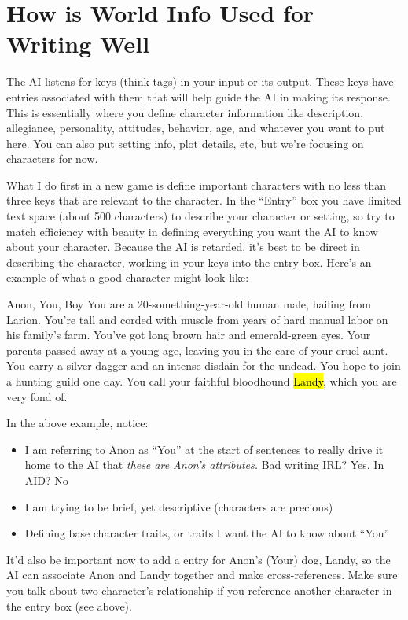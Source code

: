 \documentclass[Avsfag-main.tex]{subfiles}
\begin{document}
\section{How is World Info Used for Writing Well}

The AI listens for keys (think tags) in your input or its output.
These keys have entries associated with them that will help guide the AI in making its response.
This is essentially where you define character information like description, allegiance, personality, attitudes, behavior, age, and whatever you want to put here.
You can also put setting info, plot details, etc, but we're focusing on characters for now.

What I do first in a new game is define important characters with no less than three keys that are relevant to the character.
In the ``Entry'' box you have limited text space (about 500 characters) to describe your character or setting, so try to match efficiency with beauty in defining everything you want the AI to know about your character.
Because the AI is retarded, it's best to be direct in describing the character, working in your keys into the entry box.
Here's an example of what a good character might look like:

\begin{WI}{Anon, You, Boy}
You are a 20-something-year-old human male, hailing from Larion.
You're tall and corded with muscle from years of hard manual labor on his family's farm.
You've got long brown hair and emerald-green eyes.
Your parents passed away at a young age, leaving you in the care of your cruel aunt.
You carry a silver dagger and an intense disdain for the undead.
You hope to join a hunting guild one day.
You call your faithful bloodhound \hl{Landy}, which you are very fond of.
\end{WI}

In the above example, notice:

\begin{itemize}
\item
  I am referring to Anon as ``You'' at the start of sentences to really drive it home to the AI that \emph{these are Anon's attributes.}
  Bad writing IRL?
  Yes.
  In AID?
  No
\item
  I am trying to be brief, yet descriptive (characters are precious)
\item
  Defining base character traits, or traits I want the AI to know about ``You''
\end{itemize}

It'd also be important now to add a \wi entry for Anon's (Your) dog, Landy, so the AI can associate Anon and Landy together and make cross-references.
Make sure you talk about two character's relationship if you reference another character in the \wi entry box (see above).
\end{document}
